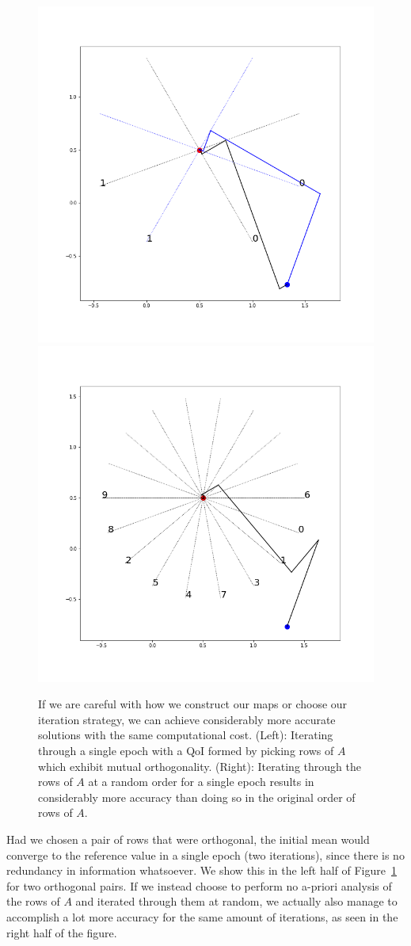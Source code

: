 \begin{figure}
  \centering
  \includegraphics[width=0.475\linewidth]{examples/iterative/10D-firstepoch-pair-smart}
  \includegraphics[width=0.475\linewidth]{examples/iterative/10D-firstepoch-rand}
  \caption{
  If we are careful with how we construct our maps or choose our iteration strategy, we can achieve considerably more accurate solutions with the same computational cost.
  (Left): Iterating through a single epoch with a QoI formed by picking rows of $A$ which exhibit mutual orthogonality.
  (Right): Iterating through the rows of $A$ at a random order for a single epoch results in considerably more accuracy than doing so in the original order of rows of $A$.
  }
  \label{fig:iterative-linear-demo-smart}
\end{figure}

Had we chosen a pair of rows that were orthogonal, the initial mean would converge to the reference value in a single epoch (two iterations), since there is no redundancy in information whatsoever.
We show this in the left half of Figure~\ref{fig:iterative-linear-demo-smart} for two orthogonal pairs.
If we instead choose to perform no a-priori analysis of the rows of $A$ and iterated through them at random, we actually also manage to accomplish a lot more accuracy for the same amount of iterations, as seen in the right half of the figure.


